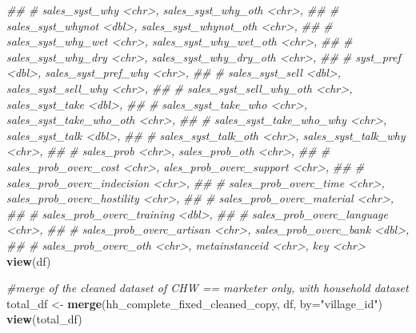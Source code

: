 \documentclass[
]{article}
\newenvironment{Shaded}{\begin{snugshade}}{\end{snugshade}}
\newcommand{\CommentTok}[1]{\textcolor[rgb]{0.56,0.35,0.01}{\textit{#1}}}
\newcommand{\DataTypeTok}[1]{\textcolor[rgb]{0.13,0.29,0.53}{#1}}
\newcommand{\KeywordTok}[1]{\textcolor[rgb]{0.13,0.29,0.53}{\textbf{#1}}}
\newcommand{\NormalTok}[1]{#1}
\newcommand{\StringTok}[1]{\textcolor[rgb]{0.31,0.60,0.02}{#1}}
\begin{document}
\begin{Shaded}
\begin{Highlighting}[]
\CommentTok{## #   sales_syst_why <chr>, sales_syst_why_oth <chr>,}
\CommentTok{## #   sales_syst_whynot <dbl>, sales_syst_whynot_oth <chr>,}
\CommentTok{## #   sales_syst_why_wet <chr>, sales_syst_why_wet_oth <chr>,}
\CommentTok{## #   sales_syst_why_dry <chr>, sales_syst_why_dry_oth <chr>,}
\CommentTok{## #   syst_pref <dbl>, sales_syst_pref_why <chr>,}
\CommentTok{## #   sales_syst_sell <dbl>, sales_syst_sell_why <chr>,}
\CommentTok{## #   sales_syst_sell_why_oth <chr>, sales_syst_take <dbl>,}
\CommentTok{## #   sales_syst_take_who <chr>, sales_syst_take_who_oth <chr>,}
\CommentTok{## #   sales_syst_take_who_why <chr>, sales_syst_talk <dbl>,}
\CommentTok{## #   sales_syst_talk_oth <chr>, sales_syst_talk_why <chr>,}
\CommentTok{## #   sales_prob <chr>, sales_prob_oth <chr>,}
\CommentTok{## #   sales_prob_overc_cost <chr>, ales_prob_overc_support <chr>,}
\CommentTok{## #   sales_prob_overc_indecision <chr>,}
\CommentTok{## #   sales_prob_overc_time <chr>, sales_prob_overc_hostility <chr>,}
\CommentTok{## #   sales_prob_overc_material <chr>,}
\CommentTok{## #   sales_prob_overc_training <dbl>,}
\CommentTok{## #   sales_prob_overc_language <chr>,}
\CommentTok{## #   sales_prob_overc_artisan <chr>, sales_prob_overc_bank <dbl>,}
\CommentTok{## #   sales_prob_overc_oth <chr>, metainstanceid <chr>, key <chr>}
\KeywordTok{view}\NormalTok{(df)}


\CommentTok{#merge of the cleaned dataset of CHW == marketer only, with household dataset}
\NormalTok{total_df <-}\StringTok{ }\KeywordTok{merge}\NormalTok{(hh_complete_fixed_cleaned_copy, df, }\DataTypeTok{by=}\StringTok{"village_id"}\NormalTok{)}
\KeywordTok{view}\NormalTok{(total_df)}


\end{Highlighting}
\end{Shaded}
\end{document}
